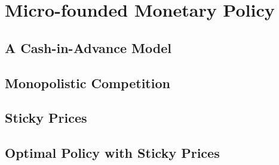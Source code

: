 \documentclass[11pt,a4paper,oneside]{book}
\begin{document}


\part{Micro-founded Monetary Policy}
\chapter{A Cash-in-Advance Model}


\chapter{Monopolistic Competition}


\chapter{Sticky Prices}


\chapter{Optimal Policy with Sticky Prices}




\backmatter

\end{document}
